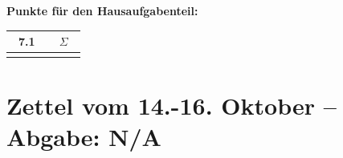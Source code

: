 \documentclass{article}
\begin{document}
\thispagestyle{empty}
\-\vspace{0.5cm}
\begin{center}
	\fach
	\vspace{2cm}
	\gruppe
	\vspace{2cm}
	\memOne
	\memTwo
	\memThree
	\memFour
	\vspace{1cm}
	\datum
	\vspace{1cm}
	
	\textbf{Punkte für den Hausaufgabenteil:}\\
	\vspace{1cm}
	\begin{tabular}{c|c}
	~7.1~&~$\Sigma$~	\\	\hline
		 &
	\end{tabular}
	
\end{center}
\newpage






























\thispagestyle{empty}
\tableofcontents
\newpage


\section{Zettel vom 14.-16. Oktober -- Abgabe: N/A}
\end{document}
